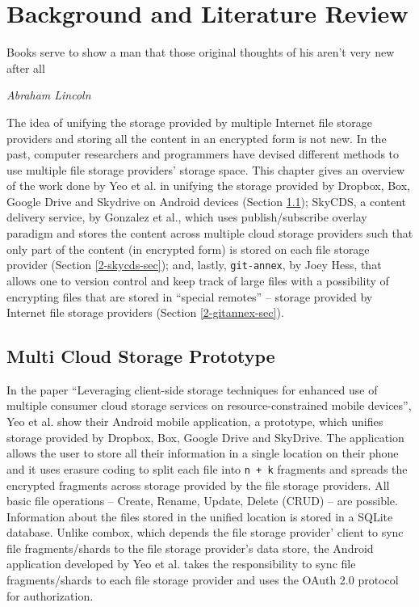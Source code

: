 \chapter{Background and Literature Review}

\epigraph{Books serve to show a man that those original thoughts of
  his aren't very new after all}{\textit{Abraham Lincoln}}

The idea of unifying the storage provided by multiple Internet file
storage providers and storing all the content in an encrypted form is
not new. In the past, computer researchers and programmers have
devised different methods to use multiple file storage providers'
storage space. This chapter gives an overview of the work done by Yeo
et al. in unifying the storage provided by Dropbox, Box, Google Drive
and Skydrive on Android devices \cite{yeo}(Section \ref{2-yeo-sec});
SkyCDS, a content delivery service, by Gonzalez et al., which uses
publish/subscribe overlay paradigm and stores the content across
multiple cloud storage providers such that only part of the content
(in encrypted form) is stored on each file storage provider
\cite{skycds}(Section \ref{2-skycds-sec}); and, lastly,
\verb+git-annex+, by Joey Hess\cite{person:joeyh}, that allows one to
version control and keep track of large files with a possibility of
encrypting files that are stored in ``special remotes'' -- storage
provided by Internet file storage providers (Section
\ref{2-gitannex-sec}).

\section{Multi Cloud Storage Prototype}\label{2-yeo-sec}

In the paper ``Leveraging client-side storage techniques for enhanced
use of multiple consumer cloud storage services on
resource-constrained mobile devices'', Yeo et al. show their Android
mobile application, a prototype, which unifies storage provided by
Dropbox, Box, Google Drive and SkyDrive. The application allows the
user to store all their information in a single location on their
phone and it uses erasure coding \cite{weatherspoon} to split each
file into \verb`n + k` fragments and spreads the encrypted fragments
across storage provided by the file storage providers. All basic file
operations -- Create, Rename, Update, Delete (CRUD) -- are
possible. Information about the files stored in the unified location
is stored in a SQLite database. Unlike combox, which depends the file
storage provider' client to sync file fragments/shards to the file
storage provider's data store, the Android application developed by
Yeo et al. takes the responsibility to sync file fragments/shards to
each file storage provider and uses the OAuth
2.0\cite{protocol:oauth2} protocol for authorization.

